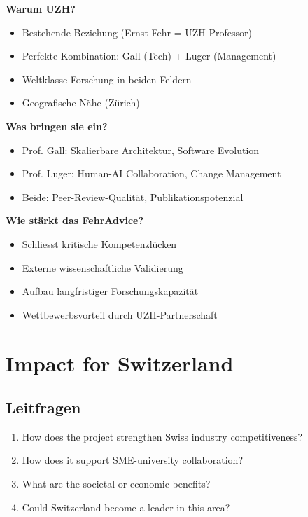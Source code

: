 \documentclass[11pt,a4paper]{article}
\begin{document}
\begin{summarybox}
\textbf{Warum UZH?}
\begin{itemize}
    \item Bestehende Beziehung (Ernst Fehr = UZH-Professor)
    \item Perfekte Kombination: Gall (Tech) + Luger (Management)
    \item Weltklasse-Forschung in beiden Feldern
    \item Geografische Nähe (Zürich)
\end{itemize}

\textbf{Was bringen sie ein?}
\begin{itemize}
    \item Prof. Gall: Skalierbare Architektur, Software Evolution
    \item Prof. Luger: Human-AI Collaboration, Change Management
    \item Beide: Peer-Review-Qualität, Publikationspotenzial
\end{itemize}

\textbf{Wie stärkt das FehrAdvice?}
\begin{itemize}
    \item Schliesst kritische Kompetenzlücken
    \item Externe wissenschaftliche Validierung
    \item Aufbau langfristiger Forschungskapazität
    \item Wettbewerbsvorteil durch UZH-Partnerschaft
\end{itemize}
\end{summarybox}

\newpage

\section{Impact for Switzerland}

\subsection{Leitfragen}

\begin{enumerate}
    \item How does the project strengthen Swiss industry competitiveness?
    \item How does it support SME-university collaboration?
    \item What are the societal or economic benefits?
    \item Could Switzerland become a leader in this area?
\end{enumerate}
\end{document}
